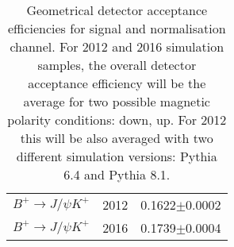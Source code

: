 \begin{table}[H]
\begin{center}
\begin{tabular}{l c c }
                $B^{+} \rightarrow J/\psi K^{+}$ & 2012 & 0.1622$\pm$0.0002\\
                $B^{+} \rightarrow J/\psi K^{+}$ & 2016 &  0.1739$\pm$0.0004  \\
                \hline
                \end{tabular}
        \end{center}
        \caption{Geometrical detector acceptance efficiencies for signal and normalisation channel. For 2012 and 2016 simulation samples, the overall detector acceptance efficiency will be the average for two possible magnetic polarity conditions: down, up. For 2012 this will be also averaged with two different simulation versions: Pythia 6.4\cite{pythia6} and Pythia 8.1\cite{pythia8}.}%
        \label{tab:MCdeteff}
        \end{table}

